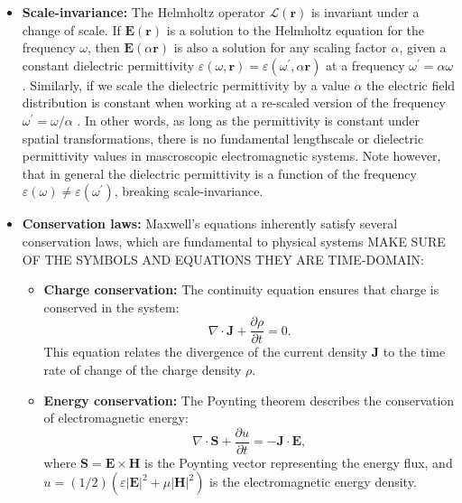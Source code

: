 \begin{itemize}
    \item \textbf{Scale-invariance:} The Helmholtz operator $\mathcal{L}(\mathbf{r})$ is invariant under a change of scale. 
    If $\mathbf{E}(\mathbf{r})$ is a solution to the Helmholtz equation for the frequency $\omega$, then $\mathbf{E}(\alpha \mathbf{r})$ 
    is also a solution for any scaling factor $\alpha$, given a constant
     dielectric permittivity $\varepsilon(\omega, \mathbf{r}) = \varepsilon (\omega^\prime, \alpha \mathbf{r})$ at a frequency $\omega^\prime = \alpha \omega$ \cite{phot_crys}. Similarly,
     if we scale the dielectric permittivity by a value $\alpha$ the electric field distribution is constant when working at a re-scaled version of the 
     frequency $\omega^\prime=\omega/\alpha $ \cite{phot_crys}.
    In other words, as long as the permittivity is constant under spatial transformations, there is no fundamental lengthscale or dielectric permittivity  
    values in mascroscopic electromagnetic systems. Note however, that in general the dielectric permittivity is a function of the frequency $\varepsilon(\omega)\neq \varepsilon(\omega^\prime)$, 
    breaking scale-invariance.
    
    \item \textbf{Conservation laws:} Maxwell's equations inherently satisfy several conservation laws, which are fundamental to physical systems MAKE SURE OF THE SYMBOLS AND EQUATIONS THEY ARE TIME-DOMAIN:
    \begin{itemize}
        \item \textbf{Charge conservation:} The continuity equation ensures that charge is conserved in the system:
        \begin{equation}
            \nabla \cdot \mathbf{J} + \frac{\partial \rho}{\partial t} = 0.
        \end{equation}
        This equation relates the divergence of the current density $\mathbf{J}$ to the time rate of change of the charge density $\rho$.

        \item \textbf{Energy conservation:} The Poynting theorem describes the conservation of electromagnetic energy:
        \begin{equation}
            \nabla \cdot \mathbf{S} + \frac{\partial u}{\partial t} = -\mathbf{J} \cdot \mathbf{E},
        \end{equation}
        where $\mathbf{S} = \mathbf{E} \times \mathbf{H}$ is the Poynting vector representing the energy flux, and $u = (1/2) (\varepsilon |\mathbf{E}|^2 + \mu |\mathbf{H}|^2)$ is the electromagnetic energy density.


\end{itemize}
\end{itemize}
